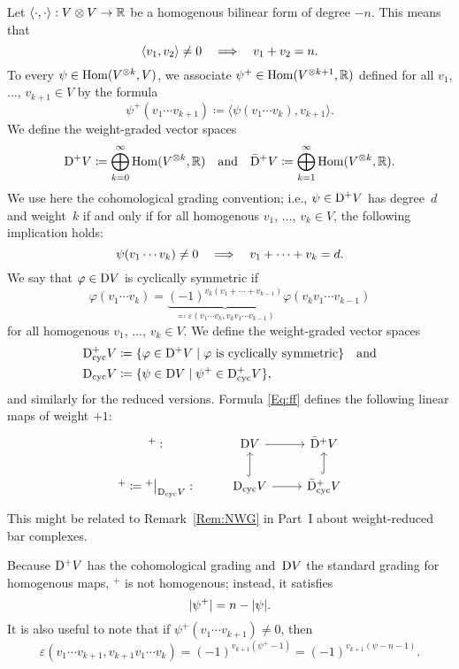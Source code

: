 \documentclass[\MainFolder/Text.tex]{subfiles}
\begin{document}
Let $\langle\cdot,\cdot\rangle: V \otimes V \rightarrow \mathbb{R}$ be a homogenous bilinear form of degree $-n$. This means that
$$ \langle v_1, v_2 \rangle \neq 0\quad\Longrightarrow\quad v_1 + v_2 = n. $$
To every $\psi\in \mathrm{Hom}(V^{\otimes k},V)$, we associate $\psi^+\in \mathrm{Hom}(V^{\otimes k + 1},\mathbb{R})$ defined for all $v_1$, $\dotsc$, $v_{k + 1} \in V$ by the formula
\begin{equation}\label{Eq:ff}
\psi^+(v_1\dotsb v_{k+1}) \coloneqq \langle \psi(v_1 \dotsb v_{k}),v_{k+1}\rangle.
\end{equation}
We define the weight-graded vector spaces
\begin{equation}\label{Eq:DSpPlusDef}
\mathrm{D}^+ V \coloneqq \bigoplus_{k=0}^\infty \mathrm{Hom}(V^{\otimes k},\mathbb{R})\quad\text{and}\quad\bar{\mathrm{D}}^+ V \coloneqq \bigoplus_{k=1}^\infty \mathrm{Hom}(V^{\otimes k},\mathbb{R}).
\end{equation}
We use here the cohomological grading convention; i.e., $\psi\in \mathrm{D}^+ V$ has degree~$d$ and weight~$k$ if and only if for all homogenous $v_1$, $\dotsc$, $v_k\in V$, the following implication holds:
$$ \psi(v_1 \dotsb v_k) \neq 0 \quad\Longrightarrow \quad v_1 + \dotsb + v_k = d. $$ 
We say that $\varphi\in \mathrm{D} V$ is cyclically symmetric if 
$$ \varphi(v_1 \dotsb v_{k}) = \underbrace{(-1)^{v_{k}(v_1 + \dotsb + v_{k-1})}}_{\eqqcolon\varepsilon(v_1\dotsb v_{k},v_{k} v_1 \dotsb v_{k-1})} \varphi(v_{k} v_1 \dotsb v_{k-1}) $$
for all homogenous $v_1$, $\dotsc$, $v_{k}\in V$. We define the weight-graded vector spaces
\begin{align*}
\mathrm{D}^+_{\mathrm{cyc}} V &\coloneqq \{\varphi\in \mathrm{D}^+ V \mid \varphi\text{ is cyclically symmetric}\}\quad\text{and} \\
\mathrm{D}_{\mathrm{cyc}} V &\coloneqq \{\psi \in \mathrm{D} V \mid \psi^+ \in \mathrm{D}^+_{\mathrm{cyc}} V \},
\end{align*}
and similarly for the reduced versions. Formula \eqref{Eq:ff} defines the following linear maps of weight $+1$:
\begin{equation}\label{Eq:CycDiag}
\begin{tikzcd}
 {}^+: & \DSp V \arrow{r} & \DSpPlusRed V \\
 {}^+\coloneqq \Restr{{}^+}{\DSpCyc V}: & \DSpCyc V \arrow{r}\arrow[hook]{u} & \DSpPlusCycRed V\arrow[hook]{u}
\end{tikzcd}
\end{equation}
This might be related to Remark~\ref{Rem:NWG} in Part~I about weight-reduced bar complexes.

Because $\mathrm{D}^+ V$ has the cohomological grading and~$\mathrm{D} V$ the standard grading for homogenous maps, ${}^+$ is not homogenous; instead, it satisfies 
$$|\psi^+| = n - |\psi|. $$
It is also useful to note that if $\psi^+(v_1\dotsb v_{k+1})\neq 0$, then
$$ \varepsilon(v_1\dotsb v_{k+1},v_{k+1} v_1 \dotsb v_k) = (-1)^{v_{k+1}(\psi^+ - 1)} = (-1)^{v_{k+1}(\psi - n - 1)}. $$
\end{document}
